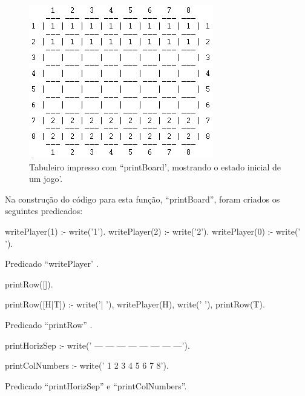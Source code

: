 \documentclass[15pt,a4paper]{article}
\begin{document}
\begin{figure}[h!]
\begin{center}
\includegraphics[scale=1]{fig_tab.png}
\caption{Tabuleiro impresso com ``printBoard', mostrando o estado inicial de um jogo'.}
\label{fig:3}
\end{center}
\end{figure}

Na construção do código para esta função, ``printBoard'', foram criados os seguintes predicados:

\begin{code}[H]
	\begin{verbatimtab}

writePlayer(1) :-
	write('1').
writePlayer(2) :-
	write('2').
writePlayer(0) :-
	write(' ').
\end{verbatimtab}
\caption{Predicado ``writePlayer' .}
\end{code}



\begin{code}[H]
	\begin{verbatimtab}

printRow([]).

printRow([H|T]) :-
	write('| '),
	writePlayer(H),
	write(' '),
	printRow(T).
\end{verbatimtab}
\caption{Predicado ``printRow'' .}
\end{code}



\begin{code}[H]
	\begin{verbatimtab}

printHorizSep   :-
	write('   --- --- --- --- --- --- --- ---').

printColNumbers :-
	write('    1   2   3   4   5   6   7   8').
\end{verbatimtab}
\caption{Predicado ``printHorizSep'' e ``printColNumbers''.}
\end{code}
\end{document}
